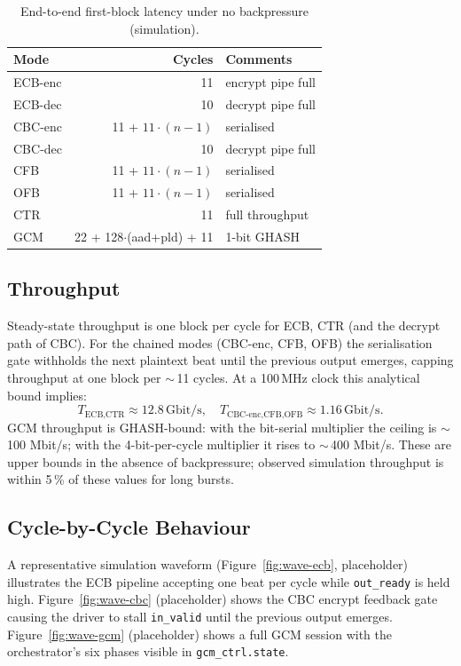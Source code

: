 \documentclass[conference,10pt,a4paper]{IEEEtran}
\begin{document}
\begin{table}[t]
\caption{End-to-end first-block latency under no backpressure (simulation).}
\label{tab:lat}
\centering
\begin{tabular}{l r l}
\toprule
\textbf{Mode} & \textbf{Cycles} & \textbf{Comments} \\
\midrule
ECB-enc & 11 & encrypt pipe full \\
ECB-dec & 10 & decrypt pipe full \\
CBC-enc & 11 + $11\cdot(n-1)$ & serialised \\
CBC-dec & 10 & decrypt pipe full \\
CFB     & 11 + $11\cdot(n-1)$ & serialised \\
OFB     & 11 + $11\cdot(n-1)$ & serialised \\
CTR     & 11 & full throughput \\
GCM     & 22 + 128$\cdot$(aad+pld) + 11 & 1-bit GHASH \\
\bottomrule
\end{tabular}
\end{table}

\subsection{Throughput}
Steady-state throughput is one block per cycle for ECB, CTR (and the
decrypt path of CBC).  For the chained modes (CBC-enc, CFB, OFB) the
serialisation gate withholds the next plaintext beat until the previous
output emerges, capping throughput at one block per $\sim$\,11 cycles.
At a 100\,MHz clock this analytical bound implies:
\[
T_\text{ECB,CTR} \approx 12.8\,\text{Gbit/s}, \quad
T_\text{CBC-enc,CFB,OFB} \approx 1.16\,\text{Gbit/s}.
\]
GCM throughput is GHASH-bound: with the bit-serial multiplier the
ceiling is $\sim$\,100 Mbit/s; with the 4-bit-per-cycle multiplier it
rises to $\sim$\,400 Mbit/s.  These are upper bounds in the absence of
backpressure; observed simulation throughput is within 5\,\% of these
values for long bursts.

\subsection{Cycle-by-Cycle Behaviour}
A representative simulation waveform (Figure~\ref{fig:wave-ecb},
placeholder) illustrates the ECB pipeline accepting one beat per cycle
while \texttt{out\_ready} is held high.  Figure~\ref{fig:wave-cbc}
(placeholder) shows the CBC encrypt feedback gate causing the driver to
stall \texttt{in\_valid} until the previous output emerges.
Figure~\ref{fig:wave-gcm} (placeholder) shows a full GCM session with
the orchestrator's six phases visible in
\texttt{gcm\_ctrl.state}.
\end{document}
